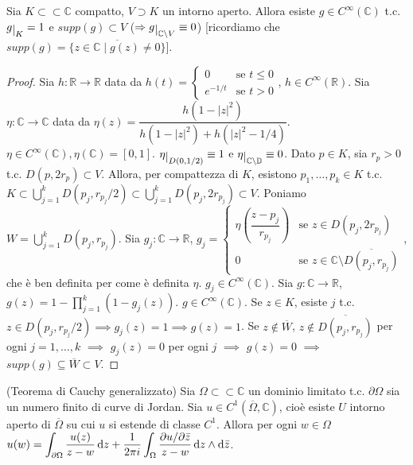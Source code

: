 \begin{lm} \label{taglio}
  Sia $K \subset \subset \mathbb{C}$ compatto, $V \supset K$ un intorno aperto. Allora esiste $g \in C^{\infty}(\mathbb{C})$ t.c. $g\restrict{K}=1$ e $supp(g) \subset V$ ($\implies g\restrict{\mathbb{C}\setminus V}\equiv 0$) [ricordiamo che $supp(g)=\overline{\{z \in \mathbb{C} \mid g(z)\not=0\}}$].
\end{lm}

\begin{proof}
  Sia $h: \mathbb{R} \longrightarrow \mathbb{R}$ data da $h(t)=\begin{cases}
    0 & \mbox{se }t\le 0\\ e^{-1/t} & \mbox{se }t>0
\end{cases}$, $h \in C^{\infty}(\mathbb{R})$. Sia $\eta: \mathbb{C} \longrightarrow \mathbb{C}$ data da $\eta(z)=\dfrac{h(1-|z|^2)}{h(1-|z|^2)+h(|z|^2-1/4)}$. $\eta \in C^{\infty}(\mathbb{C}), \eta(\mathbb{C})=[0, 1]$.
$\eta\restrict{D(0, 1/2)}\equiv 1$ e $\eta\restrict{\mathbb{C}\setminus \mathbb{D}} \equiv 0$. Dato $p \in K$, sia $r_p>0$ t.c. $D(p, 2r_p) \subset V$.
Allora, per compattezza di $K$, esistono $p_1, \dots, p_k \in K$ t.c. $\displaystyle K \subset \bigcup_{j=1}^k D(p_j, r_{p_j}/2) \subset \bigcup_{j=1}^k D(p_j, 2r_{p_j}) \subset V$. Poniamo $\displaystyle W=\bigcup_{j=1}^k D(p_j, r_{p_j})$.
Sia $g_j:\mathbb{C} \longrightarrow \mathbb{R}$, $g_j=\begin{cases}
  \eta\left(\dfrac{z-p_j}{r_{p_j}}\right) & \mbox{se }z\in D(p_j, 2r_{p_j})\\ 0 & \mbox{se }z\in\mathbb{C} \setminus \overline{D(p_j, r_{p_j})}
\end{cases}$, che è ben definita per come è definita $\eta$. $g_j \in C^{\infty}(\mathbb{C})$. Sia $g: \mathbb{C} \longrightarrow \mathbb{R}$, $\displaystyle g(z)=1-\prod_{j=1}^k (1-g_j(z))$. $g \in C^{\infty}(\mathbb{C})$.
Se $z \in K$, esiste $j$ t.c. $z \in D(p_j, r_{p_j}/2) \implies g_j(z)=1 \implies g(z)=1$. Se $z \not\in \overline{W}$, $z \not\in\overline{D(p_j, r_{p_j})}$ per ogni $j=1, \dots, k$ $\implies$ $g_j(z)=0$ per ogni $j$ $\implies$ $g(z)=0$ $\implies$ $supp(g) \subseteq \overline{W} \subset V$.
\end{proof}

\begin{thm}
  (Teorema di Cauchy generalizzato) Sia $\Omega \subset \subset \mathbb{C}$ un dominio limitato t.c. $\partial\Omega$ sia un numero finito di curve di Jordan. Sia $u \in C^1(\overline{\Omega}, \mathbb{C})$, cioè esiste $U$ intorno aperto di $\overline{\Omega}$ su cui $u$ si estende di classe $C^1$.
  Allora per ogni $w \in \Omega$ $\displaystyle u(w)=\int_{\partial \Omega} \dfrac{u(z)}{z-w}\mathop{}\!\mathrm{d} z+\dfrac{1}{2\pi i}\int_{\Omega} \dfrac{\partial u/\partial\bar{z}}{z-w}\mathop{}\!\mathrm{d} z \wedge \mathop{}\!\mathrm{d} \bar{z}$.
\end{thm}

